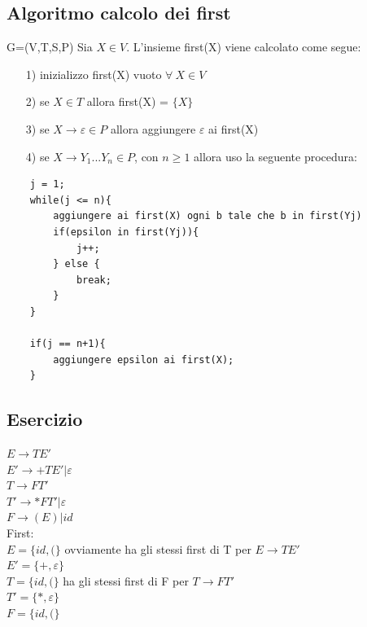 \subsection{Algoritmo calcolo dei first}
G=(V,T,S,P)
Sia $X \in V$. L'insieme first(X) viene calcolato come segue:
\begin{itemize}
    \item[1)] inizializzo first(X) vuoto $\forall\ X \in V$\\
    \item[2)] se $X \in T$ allora first(X) = $\{ X \}$\\
    \item[3)] se $X \rightarrow \varepsilon \in P$ allora aggiungere $\varepsilon$ ai first(X)\\
    \item[4)] se $X \rightarrow Y_1...Y_n \in P$, con $n \geq 1$ allora uso la seguente procedura:\\
\end{itemize}
\begin{lstlisting}
    j = 1;
    while(j <= n){
        aggiungere ai first(X) ogni b tale che b in first(Yj)
        if(epsilon in first(Yj)){
            j++;
        } else {
            break;
        }
    }

    if(j == n+1){
        aggiungere epsilon ai first(X);
    }
\end{lstlisting}

\subsection{Esercizio}
$E \rightarrow T E'$\\
$E' \rightarrow +T E' | \varepsilon $\\
$T \rightarrow FT'$\\
$T' \rightarrow *FT'| \varepsilon $\\
$F \rightarrow (E)|id $\\

First:\\
$E = \{ id, ( \}$ ovviamente ha gli stessi first di T per $E \rightarrow T E'$\\
$E' = \{ +, \varepsilon \}$\\
$T = \{ id, ( \}$ ha gli stessi first di F per $T \rightarrow FT'$\\
$T' = \{ *, \varepsilon \}$\\
$F = \{ id, ( \}$\\

